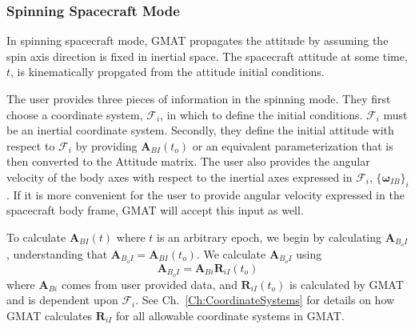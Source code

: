 \subsubsection{Spinning Spacecraft Mode}

In spinning spacecraft mode, GMAT propagates the attitude by assuming the spin
axis direction is fixed in inertial space.  The spacecraft attitude at some time,
$t$, is kinematically propgated from the attitude initial conditions.  

The user provides three pieces of information in the spinning mode. 
They first choose a coordinate system, $\mathcal{F}_i$, in which to define the
initial conditions.  $\mathcal{F}_i$ must be an inertial coordinate system. 
Secondly, they define the initial attitude with respect
to $\mathcal{F}_i$ by providing $\mathbf{A}_{BI}(t_o)$ or an equivalent
parameterization that is then converted to the Attitude matrix.  The user also
provides the angular velocity of the body axes with respect to the inertial axes
expressed in $\mathcal{F}_i$, $\{\boldsymbol\omega_{IB}\}_i$.  If it is more
convenient for the user to provide angular velocity expressed in the spacecraft
body frame, GMAT will accept this input as well.

To calculate $\mathbf{A}_{BI}(t)$ where $t$ is an arbitrary epoch,
we begin by calculating $\mathbf{A}_{B_{o}I}$, understanding that
$\mathbf{A}_{B_{o}I} = \mathbf{A}_{BI}(t_o)$.  We calculate
$\mathbf{A}_{B_{o}I}$ using
%
\begin{equation}
    \mathbf{A}_{B_{o}I} =  \mathbf{A}_{Bi}\mathbf{R}_{iI}(t_o)
    \label{Eq:ABoI}
\end{equation}
%
where $\mathbf{A}_{Bi}$ comes from user provided data, and
$\mathbf{R}_{iI}(t_o)$ is calculated by GMAT and is dependent upon
$\mathcal{F}_i$.  See Ch.~\ref{Ch:CoordinateSystems} for details on how GMAT
calculates $\mathbf{R}_{iI}$ for all allowable coordinate systems in GMAT.

